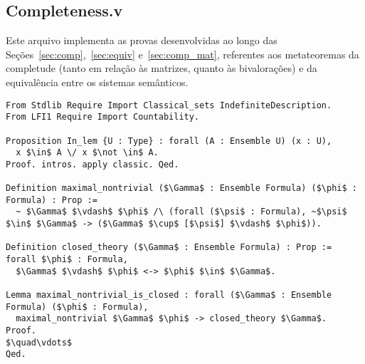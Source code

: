     
    \subsection{Completeness.v}\label{sec:completeness}
        
        Este arquivo implementa as provas desenvolvidas ao longo das Seções~\ref{sec:comp},~\ref{sec:equiv} e~\ref{sec:comp_mat}, referentes aos metateoremas da completude (tanto em relação às matrizes, quanto às bivalorações) e da equivalência entre os sistemas semânticos.

        \begin{lstlisting}[name=LFI, frame=single, language=coq]
From Stdlib Require Import Classical_sets IndefiniteDescription.
From LFI1 Require Import Countability.

Proposition In_lem {U : Type} : forall (A : Ensemble U) (x : U),
  x $\in$ A \/ x $\not \in$ A.
Proof. intros. apply classic. Qed.

Definition maximal_nontrivial ($\Gamma$ : Ensemble Formula) ($\phi$ : Formula) : Prop :=
  ~ $\Gamma$ $\vdash$ $\phi$ /\ (forall ($\psi$ : Formula), ~$\psi$ $\in$ $\Gamma$ -> ($\Gamma$ $\cup$ [$\psi$] $\vdash$ $\phi$)).

Definition closed_theory ($\Gamma$ : Ensemble Formula) : Prop := forall $\phi$ : Formula, 
  $\Gamma$ $\vdash$ $\phi$ <-> $\phi$ $\in$ $\Gamma$.

Lemma maximal_nontrivial_is_closed : forall ($\Gamma$ : Ensemble Formula) ($\phi$ : Formula),
  maximal_nontrivial $\Gamma$ $\phi$ -> closed_theory $\Gamma$.
Proof.
$\quad\vdots$
Qed.
        \end{lstlisting}

    
    